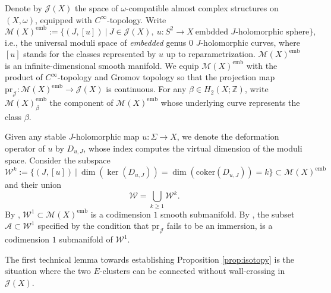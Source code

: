\documentclass[reqno]{amsart}
\numberwithin{equation}{section}
\numberwithin{equation}{section}
\numberwithin{equation}{section}
\theoremstyle{definition}
\theoremstyle{remark}
\theoremstyle{remark}
\begin{document}
Denote by $\mathcal{J}(X)$ the space of $\omega$-compatible almost complex structures on $(X, \omega)$, equipped with $C^\infty$-topology. Write
\begin{equation}
    \mathcal{M}(X)^{\mathrm{emb}} := \{ (J, [u]) \ | \ J \in \mathcal{J}(X), \ u: S^2 \to X \ \text{embdded $J$-holomorphic sphere}\},
\end{equation}
i.e., the universal moduli space of \emph{embedded} genus $0$ $J$-holomorphic curves, where $[u]$ stands for the classes represented by $u$ up to reparametrization. $\mathcal{M}(X)^{\mathrm{emb}}$ is an infinite-dimensional smooth manifold. We equip $\mathcal{M}(X)^{\mathrm{emb}}$ with the product of $C^\infty$-topology and Gromov topology so that the projection map $\mathrm{pr}_{\mathcal{J}}: \mathcal{M}(X)^{\mathrm{emb}} \to \mathcal{J}(X)$ is continuous. For any $\beta \in H_2(X;\mathbb{Z})$, write $\mathcal{M}(X)^{\mathrm{emb}}_\beta$ the component of $\mathcal{M}(X)^{\mathrm{emb}}$ whose underlying curve represents the class $\beta$.

Given any stable $J$-holomorphic map $u: \Sigma \to X$, we denote the deformation operator of $u$ by $D_{u,J}$, whose index computes the virtual dimension of the moduli space. Consider the subspace
\begin{equation}
    \mathcal{W}^k := \{ (J, [u]) \ | \ \dim (\ker(D_{u,J})) = \dim (\mathrm{coker}(D_{u,J})) = k\} \subset \mathcal{M}(X)^{\mathrm{emb}}
\end{equation}
and their union
\begin{equation}
    \mathcal{W} = \bigcup_{k \geq 1} \mathcal{W}^k.
\end{equation}
By \cite[Proposition 5.3]{IP-GV}, $\mathcal{W}^1 \subset \mathcal{M}(X)^{\mathrm{emb}}$ is a codimension $1$ smooth submanifold. By \cite[Lemma 5.6]{IP-GV}, the subset $\mathcal{A} \subset \mathcal{W}^1$ specified by the condition that $\mathrm{pr}_{\mathcal{J}}$ fails to be an immersion, is a codimension $1$ submanifold of $\mathcal{W}^1$.

The first technical lemma towards establishing Proposition \ref{prop:isotopy} is the situation where the two $E$-clusters can be connected without wall-crossing in $\mathcal{J}(X)$.
\end{document}
